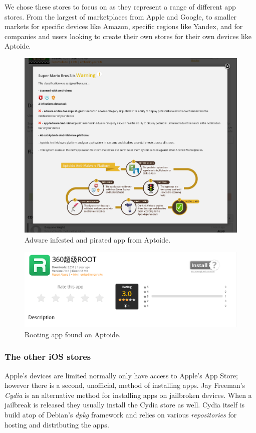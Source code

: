 \documentclass[thesis.tex]{subfiles}
\begin{document}
We chose these stores to focus on as they represent a range of different app
stores.  From the largest of marketplaces from Apple and Google, to smaller
markets for specific devices like Amazon, specific regions like Yandex, and for
companies and users looking to create their own stores for their own devices
like Aptoide.

\begin{figure}
  \centering
  \includegraphics[width=0.8\linewidth]{figures/aptoide-malware.png}
  \caption{Adware infested and pirated app from Aptoide.}
  \label{fig:aptoide-malware}
\end{figure}

\begin{figure}
  \centering
  \includegraphics[width=0.8\linewidth]{figures/aptoide-root.png}
  \caption{Rooting app found on Aptoide.}
  \label{fig:aptoide-root}
\end{figure}

\subsubsection{The other iOS stores}

Apple's devices are limited normally only have access to Apple's App Store; however there is a second, unofficial, method of installing apps.
Jay Freeman's \emph{Cydia} is an alternative method for installing apps on jailbroken devices.
When a jailbreak is released they usually install the Cydia store as well.
Cydia itself is build atop of Debian's \emph{dpkg} framework and relies on various \emph{repositories} for hosting and distributing the apps.
\end{document}

